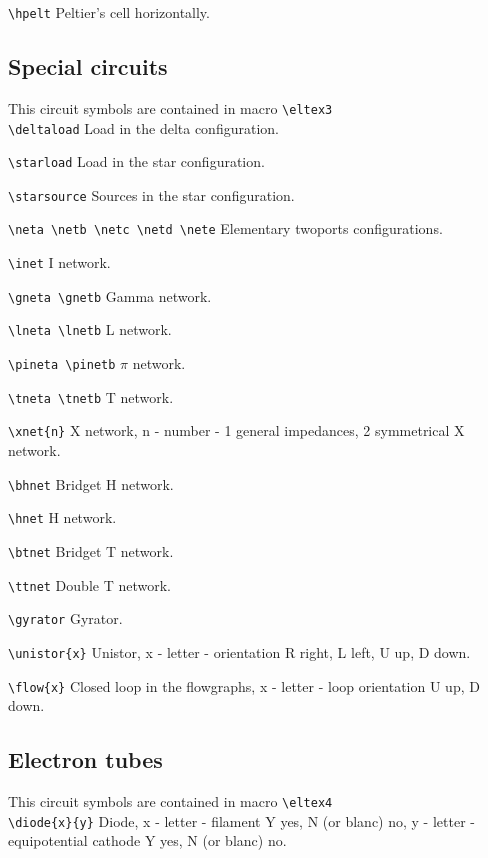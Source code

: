 \noindent
\verb?\hpelt?
Peltier's cell horizontally.



\subsection{Special circuits}

This circuit symbols are contained in macro \verb?\eltex3? \\

\noindent
\verb?\deltaload? Load in the delta configuration.

\noindent
\verb?\starload? Load in the star configuration.

\noindent
\verb?\starsource? Sources in the star configuration.

\noindent
\verb?\neta \netb \netc \netd \nete? Elementary
twoports configurations.

\noindent
\verb?\inet?
I network.

\noindent
\verb?\gneta \gnetb?
Gamma network.

\noindent
\verb?\lneta \lnetb?
L network.

\noindent
\verb?\pineta \pinetb?
$\pi$ network.

\noindent
\verb?\tneta \tnetb?
T network.

\noindent
\verb?\xnet{n}?
X network, n - number - 1 general impedances, 2
symmetrical X network.

\noindent
\verb?\bhnet?
Bridget H network.

\noindent
\verb?\hnet?
H network.

\noindent
\verb?\btnet?
Bridget T network.

\noindent
\verb?\ttnet?
Double T network.

\noindent
\verb?\gyrator?
Gyrator.

\noindent
\verb?\unistor{x}?
Unistor, x - letter - orientation R right, L left, U up, D
down.

\noindent
\verb?\flow{x}?
Closed loop in the flowgraphs, x - letter - loop orientation U
up, D down.

\subsection{Electron tubes}

This circuit symbols are contained in macro \verb?\eltex4? \\


\noindent
\verb?\diode{x}{y}?
Diode, x - letter - filament Y yes, N (or blanc) no,
y - letter - equipotential cathode Y yes, N (or blanc) no.

